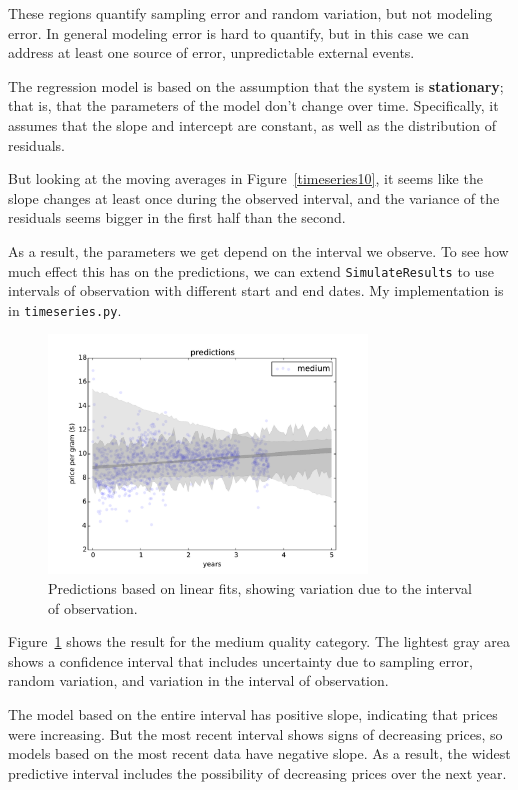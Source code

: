 \documentclass[12pt]{book}
\begin{document}
These regions quantify sampling error and random variation, but
not modeling error.  In general modeling error is hard to quantify,
but in this case we can address at least one source of error,
unpredictable external events.

The regression model is based on the assumption that the system
is {\bf stationary}; that is, that the parameters of the model
don't change over time.
Specifically, it assumes that the slope and
intercept are constant, as well as the distribution of residuals.

But looking at the moving averages in Figure~\ref{timeseries10}, it
seems like the slope changes at least once during the observed
interval, and the variance of the residuals seems bigger in the first
half than the second.

As a result, the parameters we get depend on the interval we
observe.  To see how much effect this has on the predictions,
we can extend {\tt SimulateResults} to use intervals of observation
with different start and end dates.  My implementation is in
{\tt timeseries.py}.

\begin{figure}
\centerline{\includegraphics[height=2.5in]{figs/timeseries5.pdf}}
\caption{Predictions based on linear fits, showing
variation due to the interval of observation.}
\label{timeseries5}
\end{figure}

Figure~\ref{timeseries5} shows the result for the medium quality
category.  The lightest gray area shows a confidence interval that
includes uncertainty due to sampling error, random variation, and
variation in the interval of observation.

The model based on the entire interval has positive slope, indicating
that prices were increasing.  But the most recent interval shows signs
of decreasing prices, so models based on the most recent data have
negative slope.  As a result, the widest predictive interval includes
the possibility of decreasing prices over the next year.
\end{document}
